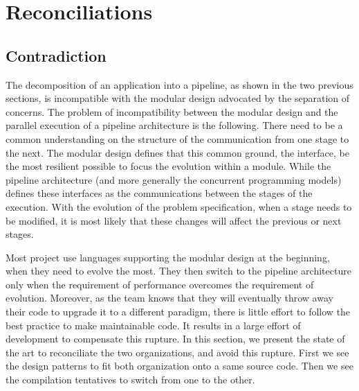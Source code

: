 







\section{Reconciliations} \label{chapter3:reconciliations}

\subsection{Contradiction}

The decomposition of an application into a pipeline, as shown in the two previous sections, is incompatible with the modular design advocated by the separation of concerns.
The problem of incompatibility between the modular design and the parallel execution of a pipeline architecture is the following.
There need to be a common understanding on the structure of the communication from one stage to the next.
The modular design defines that this common ground, the interface, be the most resilient possible to focus the evolution within a module.
While the pipeline architecture (and more generally the concurrent programming models) defines these interfaces as the communications between the stages of the execution.
With the evolution of the problem specification, when a stage needs to be modified, it is most likely that these changes will affect the previous or next stages.

Most project use languages supporting the modular design at the beginning, when they need to evolve the most.
They then switch to the pipeline architecture only when the requirement of performance overcomes the requirement of evolution.
Moreover, as the team knows that they will eventually throw away their code to upgrade it to a different paradigm, there is little effort to follow the best practice to make maintainable code.
It results in a large effort of development to compensate this rupture.
In this section, we present the state of the art to reconciliate the two organizations, and avoid this rupture.
First we see the design patterns to fit both organization onto a same source code.
Then we see the compilation tentatives to switch from one to the other.